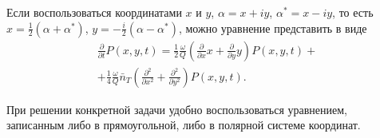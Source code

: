 Если воспользоваться координатами  $x$ и $y$, 
$\alpha = x + i y$, $\alpha^{*} = x - i y$, то есть 
$x = \frac{1}{2}\left(\alpha + \alpha^{*}\right)$,  
$y = - \frac{i}{2}\left(\alpha - \alpha^{*}\right)$,  можно уравнение
представить в виде 
\begin{eqnarray}
\frac{\partial}{\partial t}P\left(x, y, t\right) = 
\frac{1}{2}\frac{\omega}{Q}
\left(
\frac{\partial}{\partial x} x +
\frac{\partial}{\partial y} y
\right)
P\left(x, y, t\right) +
\nonumber \\
+
\frac{1}{4}
\frac{\omega}{Q}\bar{n}_T
\left(
\frac{\partial^2}{\partial x^2} +
\frac{\partial^2}{\partial y^2}
\right)
P\left(x, y, t\right).
\label{eqCh2_77a}
\end{eqnarray}

При решении конкретной задачи удобно воспользоваться уравнением,
записанным либо в прямоугольной, либо в полярной системе координат.   
